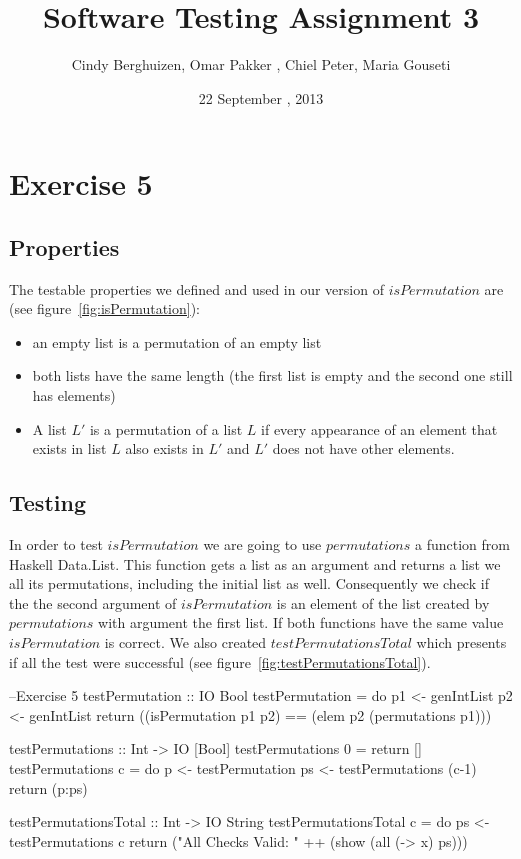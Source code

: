 \documentclass{article}
\begin{document}
\setlength{\parindent}{0cm}

\title{Software Testing Assignment 3}
\author{Cindy Berghuizen, Omar Pakker , Chiel Peter, Maria Gouseti}
\date{22 September , 2013}
\maketitle
\section*{Exercise 5}

\subsection*{Properties}
The testable properties we defined and used in our version of $isPermutation$
are (see figure~\ref{fig:isPermutation}):
\begin{itemize}
 \item an empty list is a permutation of an empty list
 \item both lists have the same length (the first list is empty and the second one still has elements)
 \item A list $L'$ is a permutation of a list $L$ if every appearance of an
element that exists in list $L$ also exists in $L'$ and $L'$ does not have other elements.
\end{itemize}

\subsection*{Testing}
In order to test $isPermutation$ we are going to use $permutations$ a function from Haskell
Data.List. This function gets a list as an argument and returns a
list we all its permutations, including the initial list as well. Consequently
we check if the the second argument of $isPermutation$ is an element of the list
created by $permutations$ with argument the first list. If both functions have
the same value $isPermutation$ is correct. We also created
$testPermutationsTotal$ which presents if all the test were successful (see figure~\ref{fig:testPermutationsTotal}).

\begin{code}
--Exercise 5
testPermutation :: IO Bool
testPermutation = do
			     p1 <- genIntList
			     p2 <- genIntList
			     return ((isPermutation p1 p2) == (elem p2 (permutations p1)))

testPermutations :: Int -> IO [Bool]
testPermutations 0 = return []
testPermutations c = do
			     p <- testPermutation
			     ps <- testPermutations (c-1)
			     return (p:ps)

testPermutationsTotal :: Int -> IO String
testPermutationsTotal c = do
			     ps <- testPermutations c
			     return ("All Checks Valid: " ++ (show (all (\x -> x) ps)))
\end{code}
\end{document}
